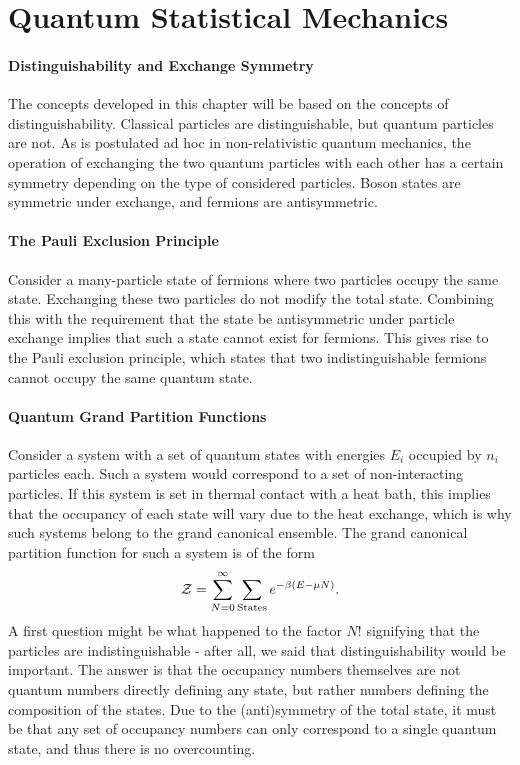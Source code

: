 \section{Quantum Statistical Mechanics}

\paragraph{Distinguishability and Exchange Symmetry}
The concepts developed in this chapter will be based on the concepts of distinguishability. Classical particles are distinguishable, but quantum particles are not. As is postulated ad hoc in non-relativistic quantum mechanics, the operation of exchanging the two quantum particles with each other has a certain symmetry depending on the type of considered particles. Boson states are symmetric under exchange, and fermions are antisymmetric.

\paragraph{The Pauli Exclusion Principle}
Consider a many-particle state of fermions where two particles occupy the same state. Exchanging these two particles do not modify the total state. Combining this with the requirement that the state be antisymmetric under particle exchange implies that such a state cannot exist for fermions. This gives rise to the Pauli exclusion principle, which states that two indistinguishable fermions cannot occupy the same quantum state.

\paragraph{Quantum Grand Partition Functions}
Consider a system with a set of quantum states with energies $E_{i}$ occupied by $n_{i}$ particles each. Such a system would correspond to a set of non-interacting particles. If this system is set in thermal contact with a heat bath, this implies that the occupancy of each state will vary due to the heat exchange, which is why such systems belong to the grand canonical ensemble. The grand canonical partition function for such a system is of the form
\begin{align*}
	\mathcal{Z} = \sum\limits_{N = 0}^{\infty}\sum\limits_{\text{States}}e^{-\beta(E - \mu N)}.
\end{align*}
A first question might be what happened to the factor $N!$ signifying that the particles are indistinguishable - after all, we said that distinguishability would be important. The answer is that the occupancy numbers themselves are not quantum numbers directly defining any state, but rather numbers defining the composition of the states. Due to the (anti)symmetry of the total state, it must be that any set of occupancy numbers can only correspond to a single quantum state, and thus there is no overcounting.

